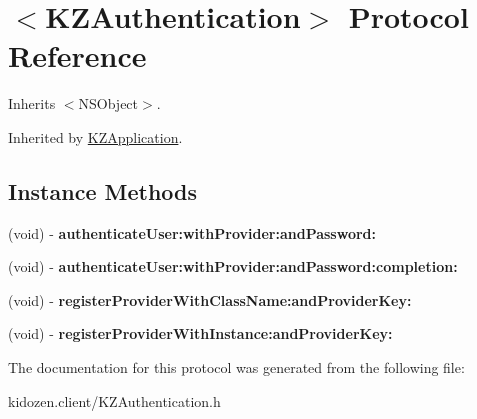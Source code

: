 \hypertarget{protocol_k_z_authentication-p}{\section{$<$K\-Z\-Authentication$>$ Protocol Reference}
\label{protocol_k_z_authentication-p}
}


Inherits $<$\-N\-S\-Object$>$.



Inherited by \hyperlink{interface_k_z_application}{K\-Z\-Application}.

\subsection*{Instance Methods}
\begin{DoxyCompactItemize}
\item 
\hypertarget{protocol_k_z_authentication-p_a34368b453ccb384802eca855a4c2f97b}{(void) -\/ {\bfseries authenticate\-User\-:with\-Provider\-:and\-Password\-:}}\label{protocol_k_z_authentication-p_a34368b453ccb384802eca855a4c2f97b}

\item 
\hypertarget{protocol_k_z_authentication-p_ac0366d96ca43ba3ea0a2dd719aab2e81}{(void) -\/ {\bfseries authenticate\-User\-:with\-Provider\-:and\-Password\-:completion\-:}}\label{protocol_k_z_authentication-p_ac0366d96ca43ba3ea0a2dd719aab2e81}

\item 
\hypertarget{protocol_k_z_authentication-p_abc009f05be9f69b01eb0347301ab8fa6}{(void) -\/ {\bfseries register\-Provider\-With\-Class\-Name\-:and\-Provider\-Key\-:}}\label{protocol_k_z_authentication-p_abc009f05be9f69b01eb0347301ab8fa6}

\item 
\hypertarget{protocol_k_z_authentication-p_ac0b8d396f81af609667c3effce7f7c3d}{(void) -\/ {\bfseries register\-Provider\-With\-Instance\-:and\-Provider\-Key\-:}}\label{protocol_k_z_authentication-p_ac0b8d396f81af609667c3effce7f7c3d}

\end{DoxyCompactItemize}


The documentation for this protocol was generated from the following file\-:\begin{DoxyCompactItemize}
\item 
kidozen.\-client/K\-Z\-Authentication.\-h\end{DoxyCompactItemize}

